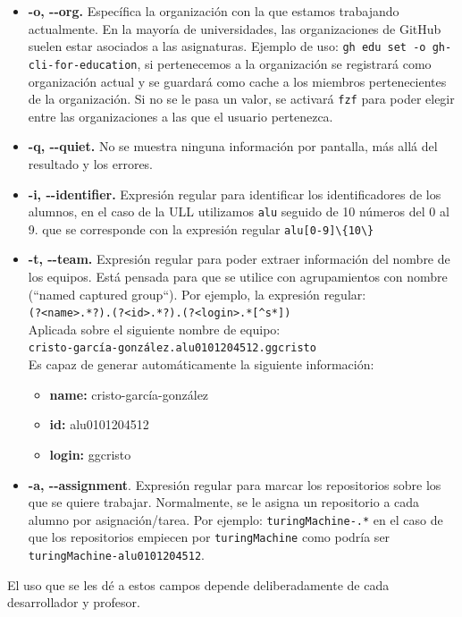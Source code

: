 \begin{itemize}
    \item \textbf{-o, -{}-org.} Específica la organización con la que estamos trabajando actualmente. En la mayoría de universidades, las organizaciones de GitHub suelen estar asociados a las asignaturas.
    Ejemplo de uso: \verb|gh edu set -o gh-cli-for-education|, si pertenecemos a la organización se registrará como organización actual y se guardará como cache a los miembros pertenecientes de la organización.
    Si no se le pasa un valor, se activará \verb|fzf| para poder elegir entre las organizaciones a las que el usuario pertenezca.
    \item \textbf{-q, -{}-quiet.} No se muestra ninguna información por pantalla, más allá del resultado y los errores.
    \item \textbf{-i, -{}-identifier.} Expresión regular para identificar los identificadores de los alumnos, en el caso de la ULL utilizamos \verb|alu| seguido de 10 números del 0 al 9. que se corresponde con la expresión regular \verb|alu[0-9]\{10\}|
    \item \textbf{-t, -{}-team.} Expresión regular para poder extraer información del nombre de los equipos. Está pensada para que se utilice con agrupamientos con nombre (``named captured group``). Por ejemplo, la expresión regular:\\ \verb|(?<name>.*?).(?<id>.*?).(?<login>.*[^s*])|\\
    Aplicada sobre el siguiente nombre de equipo:\\
    \verb|cristo-garcía-gonzález.alu0101204512.ggcristo|\\
    Es capaz de generar automáticamente la siguiente información:
    \begin{itemize}
        \item \textbf{name:} cristo-garcía-gonzález
        \item \textbf{id:} alu0101204512
        \item \textbf{login:} ggcristo
    \end{itemize}
    \item \textbf{-a, -{}-assignment}. Expresión regular para marcar los repositorios sobre los que se quiere trabajar. Normalmente, se le asigna un repositorio a cada alumno por asignación/tarea. Por ejemplo: \verb|turingMachine-.*| en el caso de que los repositorios empiecen por \verb|turingMachine| como podría ser \verb|turingMachine-alu0101204512|.
\end{itemize}
El uso que se les dé a estos campos depende deliberadamente de cada desarrollador y profesor.

